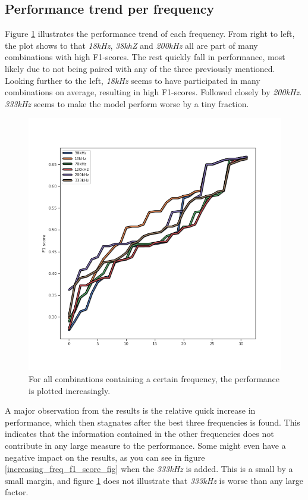     \subsection{Performance trend per frequency}
        Figure \ref{performance_trend_fig} illustrates the performance trend of each frequency. From right to left, the plot shows to that \textit{18kHz}, \textit{38khZ} and \textit{200kHz} all are part of many combinations with high F1-scores. The rest quickly fall in performance, most likely due to not being paired with any of the three previously mentioned. Looking further to the left, \textit{18kHz} seems to have participated in many combinations on average, resulting in high F1-scores. Followed closely by \textit{200kHz}. \textit{333kHz} seems to make the model perform worse by a tiny fraction.
        \begin{figure}[H]
            \centering
            \includegraphics[scale=0.7]{figures/perfomance_trend.png}
            \caption[Performance trend per frequency]{For all combinations containing a certain frequency, the performance is plotted increasingly.}
          	\medskip 
            \label{performance_trend_fig}
        \end{figure}
    
    A major observation from the results is the relative quick increase in performance, which then stagnates after the best three frequencies is found. This indicates that the information contained in the other frequencies does not contribute in any large measure to the performance. Some might even have a negative impact on the results, as you can see in figure \ref{increasing_freq_f1_score_fig} when the \textit{333kHz} is added. This is a small by a small margin, and figure \ref{performance_trend_fig} does not illustrate that \textit{333kHz} is worse than any large factor. 
    
    

